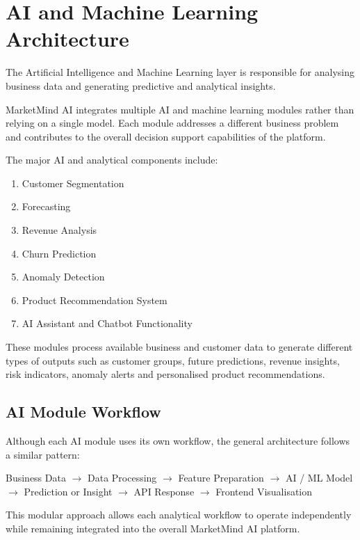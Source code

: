 \documentclass[12pt,a4paper]{report}
\begin{document}
\section{AI and Machine Learning Architecture}

The Artificial Intelligence and Machine Learning layer is responsible
for analysing business data and generating predictive and analytical
insights.

MarketMind AI integrates multiple AI and machine learning modules rather
than relying on a single model. Each module addresses a different
business problem and contributes to the overall decision support
capabilities of the platform.

The major AI and analytical components include:

\begin{enumerate}[leftmargin=1.2cm]
    \item Customer Segmentation
    \item Forecasting
    \item Revenue Analysis
    \item Churn Prediction
    \item Anomaly Detection
    \item Product Recommendation System
    \item AI Assistant and Chatbot Functionality
\end{enumerate}

These modules process available business and customer data to generate
different types of outputs such as customer groups, future predictions,
revenue insights, risk indicators, anomaly alerts and personalised
product recommendations.

\subsection{AI Module Workflow}

Although each AI module uses its own workflow, the general architecture
follows a similar pattern:

\begin{center}
Business Data
$\rightarrow$
Data Processing
$\rightarrow$
Feature Preparation
$\rightarrow$
AI / ML Model
$\rightarrow$
Prediction or Insight
$\rightarrow$
API Response
$\rightarrow$
Frontend Visualisation
\end{center}

This modular approach allows each analytical workflow to operate
independently while remaining integrated into the overall MarketMind AI
platform.
\end{document}
